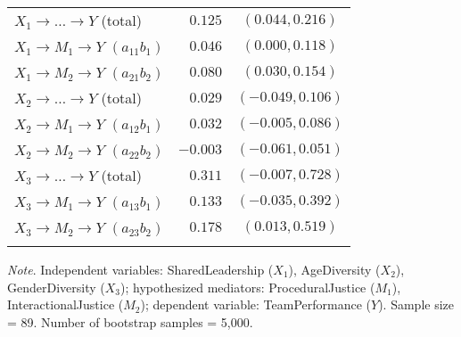 \documentclass{article}\usepackage[]{graphicx}\usepackage[]{xcolor}
\begin{document}
\begin{table}[h!]
\begin{center}
\begin{tabular}{lrrrr}
$X_{1} \rightarrow  \ldots  \rightarrow Y$ (total) & $ 0.125$ & \multicolumn{3}{c}{$( 0.044,  0.216)$} \\ 
$X_{1} \rightarrow M_{1} \rightarrow Y$ $(a_{11}b_{1})$ & $ 0.046$ & \multicolumn{3}{c}{$( 0.000,  0.118)$} \\ 
$X_{1} \rightarrow M_{2} \rightarrow Y$ $(a_{21}b_{2})$ & $ 0.080$ & \multicolumn{3}{c}{$( 0.030,  0.154)$} \\ 
$X_{2} \rightarrow  \ldots  \rightarrow Y$ (total) & $ 0.029$ & \multicolumn{3}{c}{$(-0.049,  0.106)$} \\ 
$X_{2} \rightarrow M_{1} \rightarrow Y$ $(a_{12}b_{1})$ & $ 0.032$ & \multicolumn{3}{c}{$(-0.005,  0.086)$} \\ 
$X_{2} \rightarrow M_{2} \rightarrow Y$ $(a_{22}b_{2})$ & $-0.003$ & \multicolumn{3}{c}{$(-0.061,  0.051)$} \\ 
$X_{3} \rightarrow  \ldots  \rightarrow Y$ (total) & $ 0.311$ & \multicolumn{3}{c}{$(-0.007,  0.728)$} \\ 
$X_{3} \rightarrow M_{1} \rightarrow Y$ $(a_{13}b_{1})$ & $ 0.133$ & \multicolumn{3}{c}{$(-0.035,  0.392)$} \\ 
$X_{3} \rightarrow M_{2} \rightarrow Y$ $(a_{23}b_{2})$ & $ 0.178$ & \multicolumn{3}{c}{$( 0.013,  0.519)$} \\ 
\noalign{\smallskip}\hline
\end{tabular}
\end{center}
\emph{Note}. Independent variables: SharedLeadership ($X_{1}$), AgeDiversity ($X_{2}$), GenderDiversity ($X_{3}$); hypothesized mediators: ProceduralJustice ($M_{1}$), InteractionalJustice ($M_{2}$); dependent variable: TeamPerformance ($Y$). Sample size = 89. Number of bootstrap samples = 5,000. 

\end{table}
\end{document}
